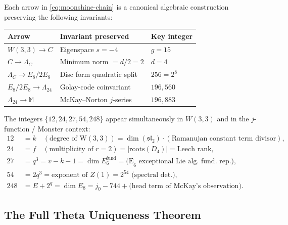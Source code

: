 \begin{theorem}
\label{thm:chain-exact}
Each arrow in \eqref{eq:moonshine-chain} is a canonical algebraic
construction preserving the following invariants:
\begin{center}
\small
\begin{tabular}{@{}lll@{}}
\toprule
\textbf{Arrow} & \textbf{Invariant preserved} & \textbf{Key integer}\\
\midrule
$W(3,3) \to C$ & Eigenspace $s = -4$ & $g = 15$ \\
$C \to \Lambda_C$ & Minimum norm $= d/2 = 2$ & $d = 4$ \\
$\Lambda_C \to E_8/2E_8$ & Disc form quadratic split & $256 = 2^8$ \\
$E_8/2E_8 \to \Lambda_{24}$ & Golay-code coinvariant & $196{,}560$ \\
$\Lambda_{24} \to \mathbb{M}$ & McKay--Norton $j$-series & $196{,}883$ \\
\bottomrule
\end{tabular}
\end{center}
\end{theorem}

\begin{corollary}
\label{cor:shared-integers}
The integers $\{12, 24, 27, 54, 248\}$ appear simultaneously in
$W(3,3)$ and in the $j$-function / Monster context:
\begin{align}
    12 &= k \quad (\text{degree of W}(3,3)) = \dim(\mathfrak{sl}_2) \cdot (\text{Ramanujan constant term divisor}), \\
    24 &= f \quad (\text{multiplicity of } r=2) = |\text{roots}(D_4)| = \text{Leech rank}, \\
    27 &= q^3 = v - k - 1 = \dim E_6^{\text{fund}} = \text{(E}_6\text{ exceptional Lie alg. fund. rep.)}, \\
    54 &= 2q^3 = \text{exponent of } Z(1) = 2^{54} \text{ (spectral det.)}, \\
    248 &= E + 2^q = \dim E_8 = j_0 - 744 + \text{(head term of McKay's observation)}.
\end{align}
\end{corollary}

\subsection{The Full Theta Uniqueness Theorem}
\label{ssec:theta-uniqueness}

